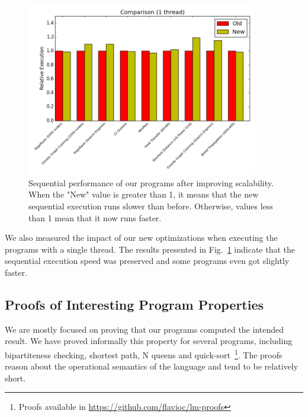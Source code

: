 \documentclass[10pt]{article}
\begin{document}
\begin{figure}[b]
\begin{center}
   \includegraphics[width=0.9\textwidth]{figures/comparison1}
\end{center}
\caption{Sequential performance of our programs after improving scalability.
   When the "New" value is greater than 1, it means that the new sequential
   execution runs slower than before. Otherwise, values less than 1 mean that it
   now runs faster.}
\label{fig:seq}
\end{figure}

We also measured the impact of our new optimizations when executing the programs
with a single thread. The results presented in Fig.~\ref{fig:seq} indicate
that the sequential execution speed was preserved and some programs even got slightly
faster.

\subsection{Proofs of Interesting Program Properties}

We are mostly focused on proving that our programs computed the intended result.
We have proved informally this property for several programs, including
bipartiteness checking, shortest path, N queens and quick-sort~\footnote{Proofs
available in \url{https://github.com/flavioc/lm-proofs}}.
The proofs reason about the operational semantics of the language and tend to be
relatively short.
\end{document}
